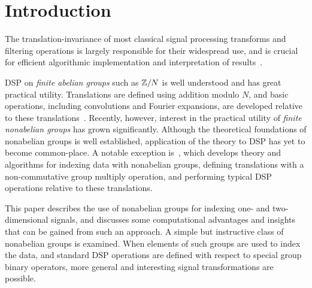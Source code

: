 \section{Introduction}
The translation-invariance of most classical signal
processing transforms and filtering operations is largely
responsible for their widespread use, and is crucial for
efficient algorithmic implementation and interpretation 
of results~\cite{An:2003}. 

DSP on \emph{finite abelian groups} such as $\mathbb{Z}/N$ is
well understood and has great practical utility.  
Translations are defined using addition modulo $N$, and 
basic operations, including convolutions and Fourier 
expansions, are developed relative to these translations~\cite{Tolimieri:1998}. 
Recently, however, interest in the practical utility of
\emph{finite nonabelian groups} has grown
significantly. Although the theoretical foundations of
nonabelian groups is well established, application of the
theory to DSP has yet to  become common-place.
A notable exception is~\cite{An:2003},
which develops theory and algorithms for
indexing data with nonabelian groups, defining translations
with a non-commutative group multiply operation, and
performing typical DSP operations relative to these
translations. 

This paper describes the use of nonabelian groups
for indexing one- and two-dimensional signals, and discusses 
some computational advantages and insights that can be gained from 
such an approach. 
A simple but instructive class of 
nonabelian groups 
is examined.  When elements of such
groups are used to index the data, and standard DSP
operations are defined with respect to special group
binary operators, more general and interesting
signal transformations are possible.
